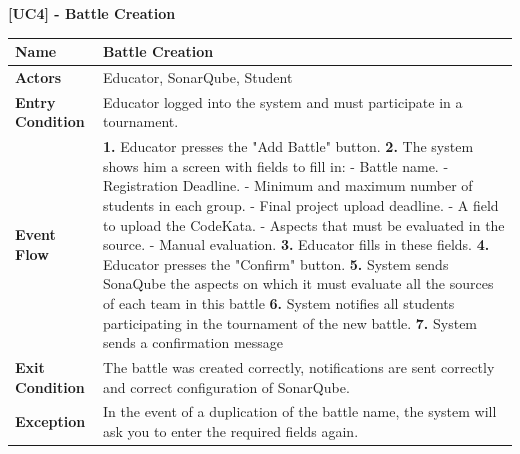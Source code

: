 \clearpage
\raggedright
\textbf{[UC4] - Battle Creation}
\begin{table}[h]
\begin{tabular}{|l|p{12cm}|} \hline 

\rule[-3mm]{0mm}{1cm}
\textbf{Name} & Battle Creation \\ \hline 

\rule[-3mm]{0mm}{1cm}
\textbf{Actors} & Educator, SonarQube, Student \\ \hline 

\rule[-3mm]{0mm}{1cm}
\textbf{Entry Condition} & Educator logged into the system and must participate in a tournament.  
\vspace{2pt}
\\ \hline 

\rule[-3mm]{0mm}{1cm}
\textbf{Event Flow} & 
\textbf{1.} Educator presses the "Add Battle" button.
\vspace{4pt}
\newline
\textbf{2.} The system shows him a screen with fields to fill in:
    - Battle name.
    \newline
    - Registration Deadline.
    \newline
    - Minimum and maximum number of students in each group.
    \newline
    - Final project upload deadline.
    \newline
    - A field to upload the CodeKata.
    \newline
    - Aspects that must be evaluated in the source.
    \newline
    - Manual evaluation.
\vspace{4pt}
\newline
\textbf{3.} Educator fills in these fields.
\vspace{4pt}
\newline
\textbf{4.} Educator presses the "Confirm" button.
\vspace{4pt}
\newline
\textbf{5.} System sends SonaQube the aspects on which it must evaluate all the sources of each team in this battle
\vspace{4pt}
\newline
\textbf{6.} System notifies all students participating in the tournament of the new battle.
\vspace{4pt}
\newline
\textbf{7.} System sends a confirmation message

\\ \hline 

\rule[-3mm]{0mm}{1cm}
\textbf{Exit Condition} & The battle was created correctly, notifications are sent correctly and correct configuration of SonarQube. \\ \hline

\rule[-3mm]{0mm}{1cm}
\textbf{Exception} & In the event of a duplication of the battle name, the system will ask you to enter the required fields again. \\ \hline


\end{tabular}
\end{table}

